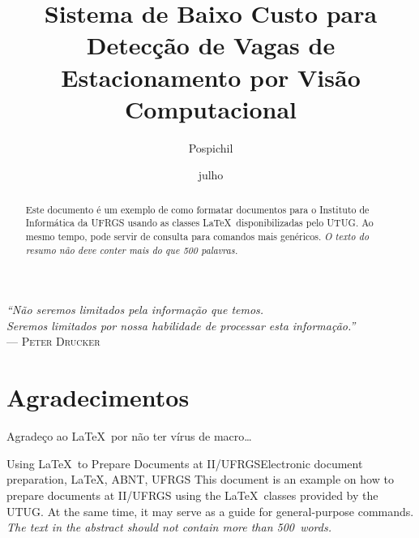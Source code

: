 \documentclass[ecp,tc]{iiufrgs}
\title{Sistema de Baixo Custo para Detecção de Vagas de Estacionamento por Visão Computacional}
\author{Pospichil}{Bruno Meybom}
\date{julho}{2015}
\begin{document}
\maketitle

\clearpage
\begin{flushright}
\mbox{}\vfill
{\sffamily\itshape
``Não seremos limitados pela informação que temos.\\
Seremos limitados por nossa habilidade de processar esta informação.''\\}
--- \textsc{Peter Drucker}
\end{flushright}

\chapter*{Agradecimentos}
Agradeço ao \LaTeX\ por não ter vírus de macro\ldots



\begin{abstract}
Este documento é um exemplo de como formatar documentos para o
Instituto de Informática da UFRGS usando as classes \LaTeX\
disponibilizadas pelo UTUG\@. Ao mesmo tempo, pode servir de consulta
para comandos mais genéricos. \emph{O texto do resumo não deve
conter mais do que 500 palavras.}
\end{abstract}

\begin{englishabstract}{Using \LaTeX\ to Prepare Documents at II/UFRGS}{Electronic document preparation, \LaTeX, ABNT, UFRGS}
This document is an example on how to prepare documents at II/UFRGS
using the \LaTeX\ classes provided by the UTUG\@. At the same time, it
may serve as a guide for general-purpose commands. \emph{The text in
the abstract should not contain more than 500~words.}
\end{englishabstract}
\end{document}
